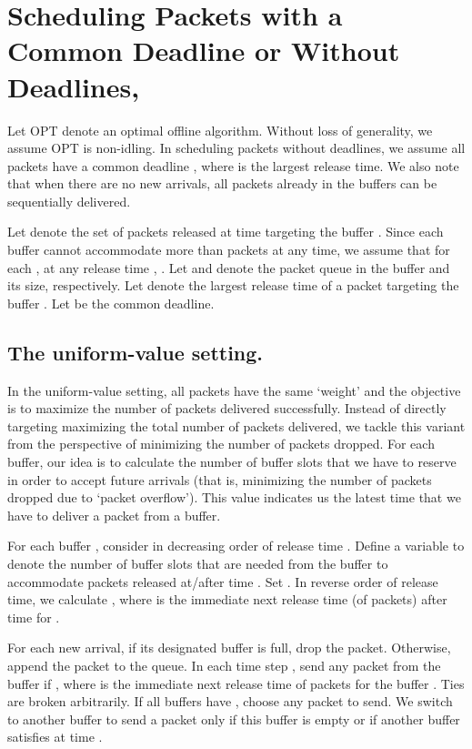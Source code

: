 \documentclass[final, 11pt]{article}
\begin{document}
\section{Scheduling Packets with a Common Deadline or Without Deadlines, }

Let OPT denote an optimal offline algorithm. Without loss of generality, we assume OPT is non-idling. In scheduling packets without deadlines, we assume all packets have a common deadline , where  is the largest release time. We also note that when there are no new arrivals, all packets already in the buffers can be sequentially delivered.

Let  denote the set of packets released at time  targeting the buffer . Since each buffer  cannot accommodate more than  packets at any time, we assume that for each , at any release time , . Let  and  denote the packet queue in the buffer  and its size, respectively.  Let  denote the largest release time of a packet targeting the buffer . Let  be the common deadline.


\subsection{The uniform-value setting.}

In the uniform-value setting, all packets have the same `weight' and the objective is to maximize the number of packets delivered successfully. Instead of directly targeting maximizing the total number of packets delivered, we tackle this variant from the perspective of minimizing the number of packets dropped. For each buffer, our idea is to calculate the number of buffer slots that we have to reserve in order to accept future arrivals (that is, minimizing the number of packets dropped due to `packet overflow'). This value indicates us the latest time that we have to deliver a packet from a buffer.

\begin{algorithm}
For each buffer , consider  in decreasing order of release time . Define a variable  to denote the number of buffer slots that are needed from the buffer  to accommodate packets released at/after time . Set . In reverse order of release time, we calculate , where  is the immediate next release time (of packets) after time  for .

For each new arrival, if its designated buffer is full, drop the packet. Otherwise, append the packet to the queue. In each time step , send any packet from the buffer  if , where  is the immediate next release time of packets for the buffer . Ties are broken arbitrarily. If all buffers  have , choose any packet to send. We switch to another buffer to send a packet only if this buffer is empty or if another buffer  satisfies  at time .
\label{alg:multiuniform}
\end{algorithm}
\end{document}
